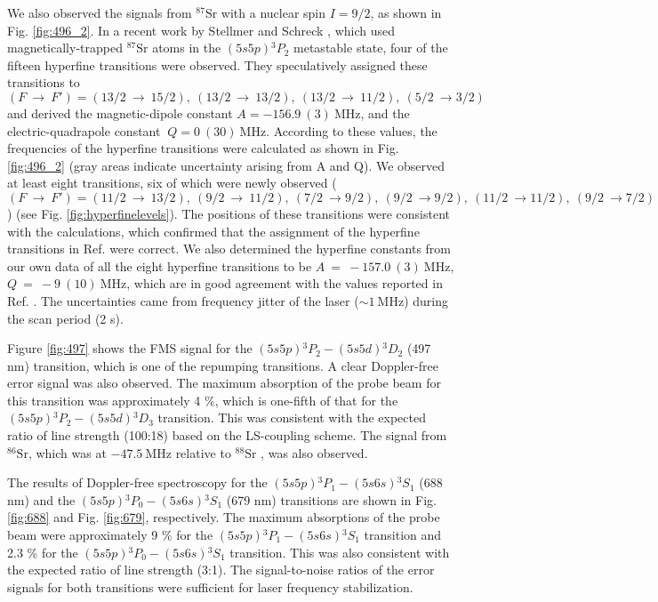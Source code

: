 \documentclass[twocolumn,10pt,a4paper]{article}
\begin{document}
We also observed the signals from $\mathrm{{}^{87}Sr}$ with a nuclear spin $I=9/2$, as shown in Fig. \ref{fig:496_2}. In a recent work by Stellmer and Schreck \cite{energylevel3}, which used magnetically-trapped $\mathrm{{}^{87}Sr}$ atoms in the $(5s5p){}^3P_2$ metastable state, four of the fifteen hyperfine transitions were observed. They speculatively assigned these transitions to $(F\ \rightarrow\ F')=(13/2\ \rightarrow\ 15/2),\ (13/2\ \rightarrow\ 13/2),\ (13/2\ \rightarrow\ 11/2),\ (5/2\ \rightarrow 3/2)$ and derived the magnetic-dipole constant $A=-156.9\ (3)\ \mathrm{MHz}$, and the electric-quadrapole constant $\ Q=0\ (30)\ \mathrm{MHz}$. According to these values, the frequencies of the hyperfine transitions were calculated as shown in Fig. \ref{fig:496_2} (gray areas indicate uncertainty arising from A and Q). We observed at least eight transitions, six of which were newly observed ($(F\ \rightarrow\ F')=(11/2\ \rightarrow\ 13/2),\ (9/2\ \rightarrow\ 11/2),\ (7/2\ \rightarrow 9/2),\ (9/2\ \rightarrow 9/2),\ (11/2\ \rightarrow 11/2),\ (9/2\ \rightarrow 7/2)$) (see Fig. \ref{fig:hyperfinelevels}). The positions of these transitions were consistent with the calculations, which confirmed that the assignment of the hyperfine transitions in Ref. \cite{energylevel3} were correct. We also determined the hyperfine constants from our own data of all the eight hyperfine transitions to be $A\ =\ -157.0\ (3)\ \mathrm{MHz}$, $Q\ =\ -9\ (10)\ \mathrm{MHz}$, which are in good agreement with the values reported in Ref. \cite{energylevel3}. The uncertainties came from frequency jitter of the laser ($\sim 1\ \mathrm{MHz}$) during the scan period (2 s).

Figure \ref{fig:497} shows the FMS signal for the $(5s5p){}^3P_2-(5s5d){}^3D_2$ (497 nm) transition, which is one of the repumping transitions. A clear Doppler-free error signal was also observed. The maximum absorption of the probe beam for this transition was approximately 4 \%, which is one-fifth of that for the $(5s5p){}^3P_2-(5s5d){}^3D_3$ transition. This was consistent with the expected ratio of line strength (100:18) based on the LS-coupling scheme. The signal from $^{86}\mathrm{Sr}$, which was at $-47.5\ \mathrm{MHz}$ relative to $^{88}\mathrm{Sr}$ \cite{energylevel3}, was also observed.

The results of Doppler-free spectroscopy for the $(5s5p){}^3P_1-(5s6s){}^3S_1$ (688 nm) and the $(5s5p){}^3P_0-(5s6s){}^3S_1$ (679 nm) transitions are shown in Fig. \ref{fig:688} and Fig. \ref{fig:679}, respectively. The maximum absorptions of the probe beam were approximately 9 \% for the $(5s5p){}^3P_1-(5s6s){}^3S_1$ transition and 2.3 \% for the $(5s5p){}^3P_0-(5s6s){}^3S_1$ transition. This was also consistent with the expected ratio of line strength (3:1). The signal-to-noise ratios of the error signals for both transitions were sufficient for laser frequency stabilization.
\end{document}
